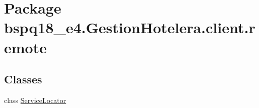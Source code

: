 \hypertarget{namespacebspq18__e4_1_1_gestion_hotelera_1_1client_1_1remote}{}\section{Package bspq18\+\_\+e4.\+Gestion\+Hotelera.\+client.\+remote}
\label{namespacebspq18__e4_1_1_gestion_hotelera_1_1client_1_1remote}
\subsection*{Classes}
\begin{DoxyCompactItemize}
\item 
class \mbox{\hyperlink{classbspq18__e4_1_1_gestion_hotelera_1_1client_1_1remote_1_1_service_locator}{Service\+Locator}}
\end{DoxyCompactItemize}
